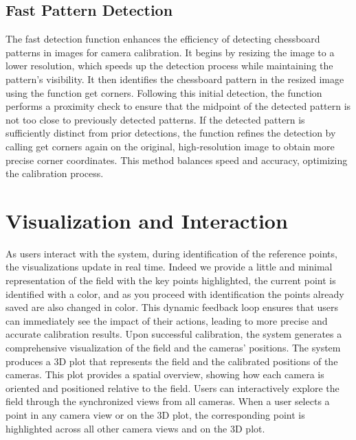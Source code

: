 \documentclass{template}
\begin{document}
\subsection{Fast Pattern Detection}
The fast detection function enhances the efficiency of detecting chessboard patterns in images for camera calibration. It begins by resizing the image to a lower resolution, which speeds up the detection process while maintaining the pattern’s visibility. It then identifies the chessboard pattern in the resized image using the function get corners. Following this initial detection, the function performs a proximity check to ensure that the midpoint of the detected pattern is not too close to previously detected patterns. If the detected pattern is sufficiently distinct from prior detections, the function refines the detection by calling get corners again on the original, high-resolution image to obtain more precise corner coordinates. This method balances speed and accuracy, optimizing the calibration process.

\section{Visualization and Interaction}
As users interact with the system, during identification of the reference points, the visualizations update in real time. Indeed we provide a little and minimal representation of the field with the key points highlighted, the current point is identified with a color, and as you proceed with identification the points already saved are also changed in color. This dynamic feedback loop ensures that users can immediately see the impact of their actions, leading to more precise and accurate calibration results.
Upon successful calibration, the system generates a comprehensive visualization of the field and the cameras' positions. The system produces a 3D plot that represents the field and the calibrated positions of the cameras. This plot provides a spatial overview, showing how each camera is oriented and positioned relative to the field.
Users can interactively explore the field through the synchronized views from all cameras. When a user selects a point in any camera view or on the 3D plot, the corresponding point is highlighted across all other camera views and on the 3D plot. 
\end{document}
